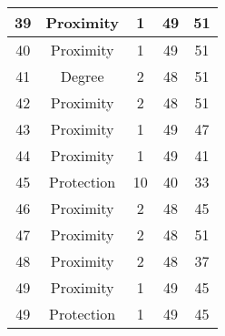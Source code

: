 \documentclass[results.tex]{subfiles}
\begin{document}
\begin{center}
\begin{tabular}{| c || c | c | c | c |}
            \hline
            39                      & Proximity                    & 1                      & 49                      & 51                   \\
            \hline
            40                      & Proximity                    & 1                      & 49                      & 51                   \\
            \hline
            41                      & Degree                       & 2                      & 48                      & 51                   \\
            \hline
            42                      & Proximity                    & 2                      & 48                      & 51                   \\
            \hline
            43                      & Proximity                    & 1                      & 49                      & 47                   \\
            \hline
            44                      & Proximity                    & 1                      & 49                      & 41                   \\
            \hline
            45                      & Protection                   & 10                     & 40                      & 33                   \\
            \hline
            46                      & Proximity                    & 2                      & 48                      & 45                   \\
            \hline
            47                      & Proximity                    & 2                      & 48                      & 51                   \\
            \hline
            48                      & Proximity                    & 2                      & 48                      & 37                   \\
            \hline
            49                      & Proximity                    & 1                      & 49                      & 45                   \\
            \hline
            49                      & Protection                   & 1                      & 49                      & 45                   \\
            \hline
        \end{tabular}
    \end{center}
\end{document}
